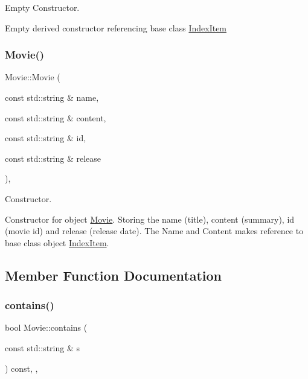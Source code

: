 Empty Constructor. 

Empty derived constructor referencing base class \hyperlink{class_index_item}{Index\+Item} \mbox{\label{class_movie_a17b379568b67f19feb4629a45e837614}} 
\subsubsection{\texorpdfstring{Movie()}{Movie()}\hspace{0.1cm}{\footnotesize\ttfamily [2/2]}}
{\footnotesize\ttfamily Movie\+::\+Movie (\begin{DoxyParamCaption}\item[{const std\+::string \&}]{name,  }\item[{const std\+::string \&}]{content,  }\item[{const std\+::string \&}]{id,  }\item[{const std\+::string \&}]{release }\end{DoxyParamCaption})\hspace{0.3cm}{\ttfamily [inline]}, {\ttfamily [explicit]}}



Constructor. 

Constructor for object \hyperlink{class_movie}{Movie}. Storing the name (title), content (summary), id (movie id) and release (release date). The Name and Content makes reference to base class object \hyperlink{class_index_item}{Index\+Item}. 

\subsection{Member Function Documentation}
\mbox{\label{class_movie_ad6ee4833582077b9a6543ba574343005}} 
\subsubsection{\texorpdfstring{contains()}{contains()}}
{\footnotesize\ttfamily bool Movie\+::contains (\begin{DoxyParamCaption}\item[{const std\+::string \&}]{s }\end{DoxyParamCaption}) const\hspace{0.3cm}{\ttfamily [inline]}, {\ttfamily [override]}, {\ttfamily [virtual]}}



